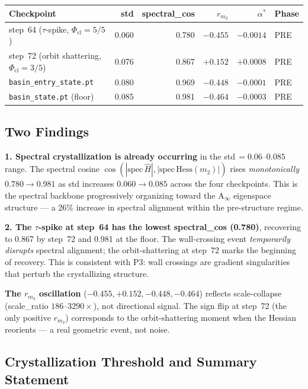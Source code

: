\documentclass[11pt]{amsart}
\begin{document}
\begin{center}
\small
\begin{tabular}{@{}lrrrrl@{}}
\toprule
Checkpoint & std & spectral\_cos & $r_{m_2}$ & $\alpha^*$ & Phase \\
\midrule
step~64 ($\tau$-spike, $\Phi_\mathrm{cl}=5/5$)
  & 0.060 & 0.780 & $-0.455$ & $-0.0014$ & PRE \\
step~72 (orbit shattering, $\Phi_\mathrm{cl}=3/5$)
  & 0.076 & 0.867 & $+0.152$ & $+0.0008$ & PRE \\
\texttt{basin\_entry\_state.pt}
  & 0.080 & 0.969 & $-0.448$ & $-0.0001$ & PRE \\
\texttt{basin\_state.pt} (floor)
  & 0.085 & 0.981 & $-0.464$ & $-0.0003$ & PRE \\
\bottomrule
\end{tabular}
\end{center}

\subsection{Two Findings}

\textbf{1. Spectral crystallization is already occurring}
in the std\,$= 0.06$--$0.085$ range.
The spectral cosine $\cos(|\mathrm{spec}\,\hat{H}|,|\mathrm{spec}\,\mathrm{Hess}(m_2)|)$
rises \emph{monotonically} $0.780 \to 0.981$ as std increases
$0.060 \to 0.085$ across the four checkpoints.
This is the spectral backbone progressively organizing
toward the A$_\infty$ eigenspace structure --- a 26\% increase
in spectral alignment within the pre-structure regime.

\textbf{2. The $\tau$-spike at step~64 has the lowest
spectral\_cos (0.780)}, recovering to 0.867 by step~72
and 0.981 at the floor.
The wall-crossing event \emph{temporarily disrupts} spectral alignment;
the orbit-shattering at step~72 marks the beginning of recovery.
This is consistent with P3: wall crossings are gradient
singularities that perturb the crystallizing structure.

\textbf{The $r_{m_2}$ oscillation} ($-0.455, +0.152, -0.448, -0.464$)
reflects scale-collapse (scale\_ratio $186$--$3290\times$),
not directional signal.
The sign flip at step~72 (the only positive $r_{m_2}$)
corresponds to the orbit-shattering moment when the Hessian
reorients --- a real geometric event, not noise.

\subsection{Crystallization Threshold and Summary Statement}
\end{document}
